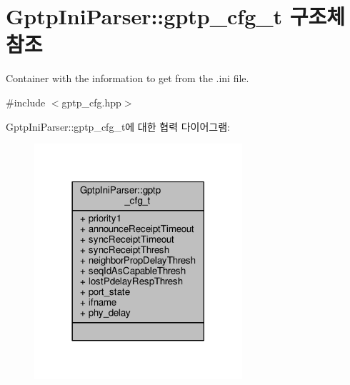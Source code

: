 \hypertarget{struct_gptp_ini_parser_1_1gptp__cfg__t}{}\section{Gptp\+Ini\+Parser\+:\+:gptp\+\_\+cfg\+\_\+t 구조체 참조}
\label{struct_gptp_ini_parser_1_1gptp__cfg__t}


Container with the information to get from the .ini file.  




{\ttfamily \#include $<$gptp\+\_\+cfg.\+hpp$>$}



Gptp\+Ini\+Parser\+:\+:gptp\+\_\+cfg\+\_\+t에 대한 협력 다이어그램\+:
\nopagebreak
\begin{figure}[H]
\begin{center}
\leavevmode
\includegraphics[width=218pt]{struct_gptp_ini_parser_1_1gptp__cfg__t__coll__graph}
\end{center}
\end{figure}
